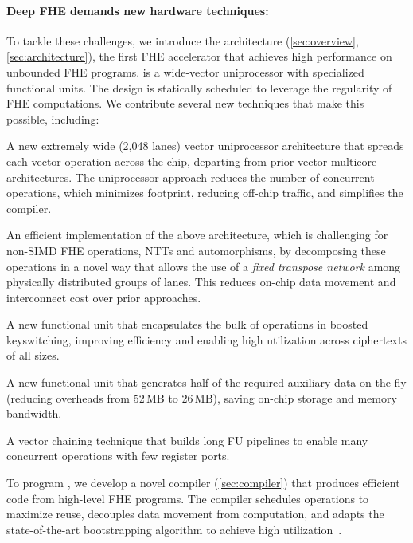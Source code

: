 \paragraph{Deep FHE demands new hardware techniques:}
To tackle these challenges, we introduce the \emph{\name} architecture (\autoref{sec:overview}, \autoref{sec:architecture}),
the first FHE accelerator that achieves high performance on unbounded FHE programs.
\name is a wide-vector uniprocessor with specialized functional units.
The design is statically scheduled to leverage the regularity of FHE computations.
We contribute several new techniques that make this possible, including:
\begin{compactitem}
\item A new extremely wide (2,048 lanes) vector uniprocessor architecture that
    spreads each vector operation across the chip, departing from prior vector multicore architectures.
The uniprocessor approach reduces the number of concurrent operations, which minimizes footprint,
  reducing off-chip traffic, and simplifies the compiler.
\item An efficient implementation of the above architecture, which is challenging for non-SIMD FHE operations, NTTs and automorphisms,
  by decomposing these operations in a novel way that allows the use of a \emph{fixed transpose network} among physically distributed groups of lanes.
  This reduces on-chip data movement and interconnect cost over prior approaches.
\item A new functional unit that encapsulates the bulk of operations in boosted keyswitching, improving efficiency and enabling high utilization across ciphertexts of all sizes.
\item A new functional unit that generates half of the required auxiliary data on the fly (reducing overheads from 52\,MB to 26\,MB), saving on-chip storage and memory bandwidth.
\item A vector chaining technique that builds long FU pipelines to enable many concurrent operations with few register ports.
\end{compactitem}
To program \name, we develop a novel compiler (\autoref{sec:compiler}) that produces efficient code from high-level FHE programs.
The compiler schedules operations to maximize reuse, decouples data movement from computation,
and adapts the state-of-the-art bootstrapping algorithm to achieve high
utilization~\cite{bossuat:crypto21:efficient}.


